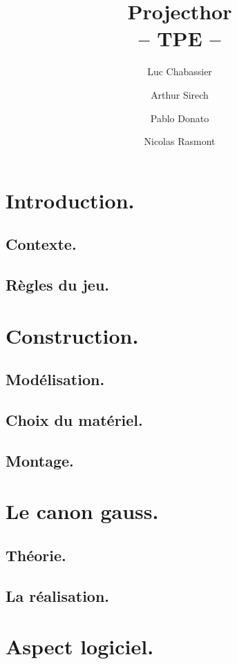 \documentclass{report}
\title{Projecthor\\-- TPE --}
\author{Luc Chabassier \and Arthur Sirech \and Pablo Donato \and Nicolas Rasmont}
\begin{document}
\maketitle

\tableofcontents

\part{Introduction.}
\chapter{Contexte.}


\chapter{Règles du jeu.}


\part{Construction.}
\chapter{Modélisation.}
% 

\chapter{Choix du matériel.} %
% 
% 

\chapter{Montage.}
% 

\part{Le canon gauss.}
\chapter{Théorie.}
% 

\chapter{La réalisation.}
% 

\part{Aspect logiciel.}
\end{document}

